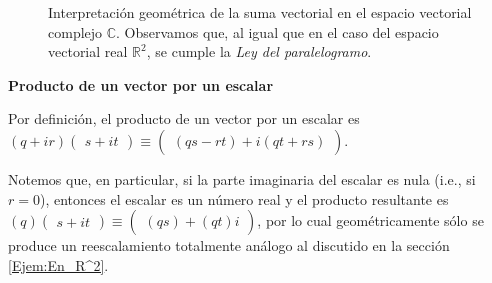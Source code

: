 \documentclass[apuntes]{subfiles}
\begin{document}
\begin{figure}[h!]
    \centering
    \caption{Interpretación geométrica de la suma vectorial en el espacio vectorial complejo $\mathbb{C}$. Observamos que, al igual que en el caso del espacio vectorial real $\mathbb{R}^2$, se cumple la \emph{Ley del paralelogramo}.}
    \label{fig:Suma_vectorial_compleja}
\end{figure}



\vspace{3mm}
\textbf{Producto de un vector por un escalar}
\vspace{3mm}

Por definición, el producto de un vector por un escalar es $(q+ir)\begin{pmatrix}s+it\end{pmatrix}\equiv\begin{pmatrix}(qs-rt)+i(qt+rs)\end{pmatrix}$.

Notemos que, en particular, si la parte imaginaria del escalar es nula (i.e., si $r=0$), entonces el escalar es un número real y el producto resultante es $(q)\begin{pmatrix}s+it\end{pmatrix}\equiv\begin{pmatrix}(qs)+(qt)i\end{pmatrix}$, por lo cual geométricamente sólo se produce un reescalamiento totalmente análogo al discutido en la sección \ref{Ejem:En_R^2}.
\end{document}

